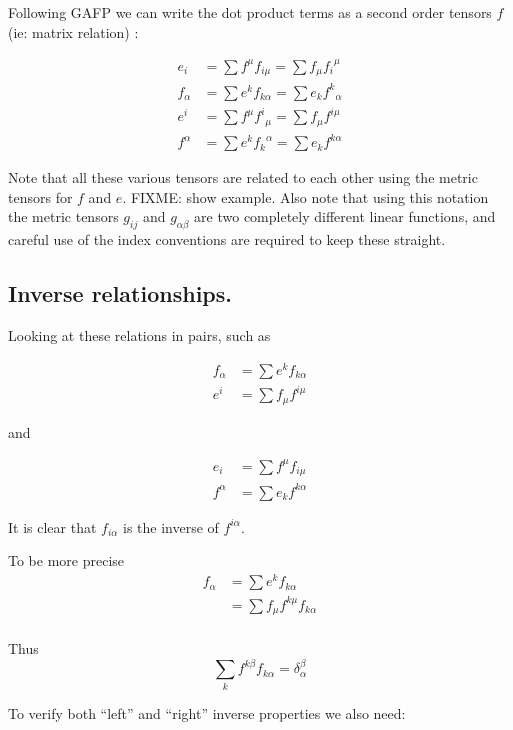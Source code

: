 \documentclass{article}      %
\begin{document}
Following GAFP we can write the dot product terms as a second order tensors $f$ (ie: matrix relation) :

\begin{align*}
e_i 		&= \sum f^{\mu} f_{i\mu}  	= \sum f_{\mu} {f_i}^{\mu} \\
f_{\alpha} 	&= \sum e^k f_{k\alpha} 	= \sum e_k {f^k}_{\alpha} \\
e^i 		&= \sum f^{\mu} {f^i}_{\mu} 	= \sum f_{\mu} f^{i \mu} \\
f^{\alpha} 	&= \sum e^k {f_k}^{\alpha}  	= \sum e_k f^{k\alpha}
\end{align*}

Note that all these various tensors are related to each other using the metric tensors for $f$ and $e$.  FIXME: show example.  Also note that using this notation the metric tensors $g_{ij}$ and $g_{\alpha\beta}$ are two completely different linear functions, and careful use of the index conventions are required to keep these straight.

\subsection{ Inverse relationships. }

Looking at these relations in pairs, such as

\begin{align*}
f_{\alpha} 	&= \sum e^k f_{k\alpha} \\ 
e^i 		&= \sum f_{\mu} f^{i \mu} 
\end{align*}

and 

\begin{align*}
e_i 		&= \sum f^{\mu} f_{i\mu} \\
f^{\alpha} 	&= \sum e_k f^{k\alpha}
\end{align*}

It is clear that $f_{i\alpha}$ is the inverse of $f^{i\alpha}$.  

To be more precise 
\begin{align*}
f_{\alpha} 
&= \sum e^k f_{k\alpha} \\ 
&= \sum f_{\mu} f^{k \mu} f_{k\alpha} \\ 
\end{align*}

Thus
\begin{equation}
\sum_k f^{k \beta} f_{k\alpha} = \delta_{\alpha}^{\beta}
\end{equation}

To verify both ``left'' and ``right'' inverse properties we also need:
\end{document}
